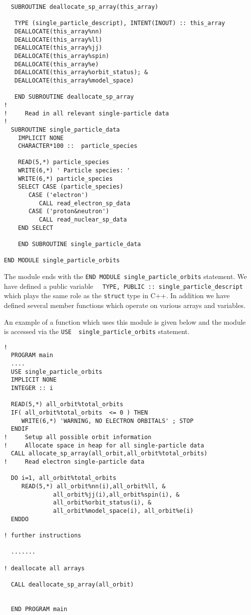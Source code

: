 \begin{lstlisting}
  SUBROUTINE deallocate_sp_array(this_array)
   
   TYPE (single_particle_descript), INTENT(INOUT) :: this_array
   DEALLOCATE(this_array%nn) 
   DEALLOCATE(this_array%ll)
   DEALLOCATE(this_array%jj) 
   DEALLOCATE(this_array%spin)
   DEALLOCATE(this_array%e) 
   DEALLOCATE(this_array%orbit_status); &
   DEALLOCATE(this_array%model_space)
            
   END SUBROUTINE deallocate_sp_array
!
!     Read in all relevant single-particle data
!
  SUBROUTINE single_particle_data
    IMPLICIT NONE
    CHARACTER*100 ::  particle_species

    READ(5,*) particle_species
    WRITE(6,*) ' Particle species: '
    WRITE(6,*) particle_species
    SELECT CASE (particle_species)
       CASE ('electron')
          CALL read_electron_sp_data
       CASE ('proton&neutron')
          CALL read_nuclear_sp_data
    END SELECT

    END SUBROUTINE single_particle_data

END MODULE single_particle_orbits
\end{lstlisting}
The module ends with the \verb?END MODULE single_particle_orbits? statement. We have defined a public variable
\verb?  TYPE, PUBLIC :: single_particle_descript?  which plays the same role as the \verb?struct? type
in C++. In addition we have defined several  member functions which operate on various arrays and variables.

An example of a function which uses this module is given below and the module is accessed via the
\verb?USE  single_particle_orbits? statement.  

\begin{lstlisting}
! 
  PROGRAM main
  ....
  USE single_particle_orbits
  IMPLICIT NONE
  INTEGER :: i

  READ(5,*) all_orbit%total_orbits 
  IF( all_orbit%total_orbits  <= 0 ) THEN
     WRITE(6,*) 'WARNING, NO ELECTRON ORBITALS' ; STOP
  ENDIF
!     Setup all possible orbit information
!     Allocate space in heap for all single-particle data
  CALL allocate_sp_array(all_orbit,all_orbit%total_orbits) 
!     Read electron single-particle data

  DO i=1, all_orbit%total_orbits 
     READ(5,*) all_orbit%nn(i),all_orbit%ll, &
              all_orbit%jj(i),all_orbit%spin(i), &
              all_orbit%orbit_status(i), &
              all_orbit%model_space(i), all_orbit%e(i)
  ENDDO

! further instructions

  .......

! deallocate all arrays

  CALL deallocate_sp_array(all_orbit)  


  END PROGRAM main
\end{lstlisting}


